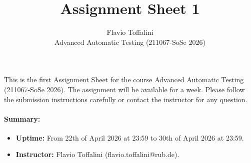 \documentclass[12pt]{article}
\begin{document}
 
 
\title{Assignment Sheet 1}
\author{Flavio Toffalini\\ %
Advanced Automatic Testing (211067-SoSe 2026)}

\maketitle

\noindent This is the first Assignment Sheet for the course Advanced Automatic
Testing (211067-SoSe 2026). The assignment will be available for a week. Please
follow the submission instructions carefully or contact the instructor for any
question.

\paragraph{Summary:}
\begin{itemize}
    \item \textbf{Uptime:} From 22th of April 2026 at 23:59 to 30th of April 2026 at 23:59.
    \item \textbf{Instructor:} Flavio Toffalini (flavio.toffalini@rub.de).
\end{itemize}






\end{document}
